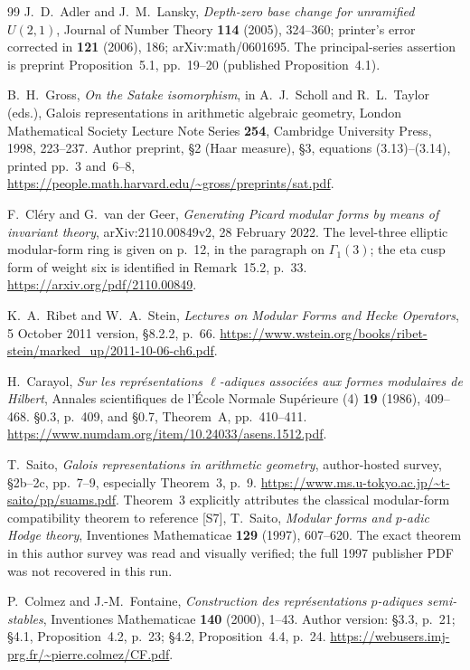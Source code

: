 \documentclass[11pt,a4paper]{article}
\theoremstyle{definition}
\begin{document}
\begin{thebibliography}{99}
J.~D.~Adler and J.~M.~Lansky,
\emph{Depth-zero base change for unramified $U(2,1)$},
Journal of Number Theory \textbf{114} (2005), 324--360;
printer's error corrected in \textbf{121} (2006), 186;
arXiv:math/0601695.
The principal-series assertion is preprint Proposition~5.1, pp.~19--20
(published Proposition~4.1).

B.~H.~Gross, \emph{On the Satake isomorphism}, in A.~J.~Scholl and
R.~L.~Taylor (eds.), Galois representations in arithmetic algebraic
geometry, London Mathematical Society Lecture Note Series \textbf{254},
Cambridge University Press, 1998, 223--237.
Author preprint, \S2 (Haar measure), \S3, equations (3.13)--(3.14),
printed pp.~3 and~6--8,
\url{https://people.math.harvard.edu/~gross/preprints/sat.pdf}.

F.~Cl\'ery and G.~van der Geer,
\emph{Generating Picard modular forms by means of invariant theory},
arXiv:2110.00849v2, 28 February 2022.
The level-three elliptic modular-form ring is given on p.~12, in the
paragraph on $\Gamma_1(3)$; the eta cusp form of weight six is identified
in Remark~15.2, p.~33.
\url{https://arxiv.org/pdf/2110.00849}.


K.~A.~Ribet and W.~A.~Stein,
\emph{Lectures on Modular Forms and Hecke Operators},
5 October 2011 version, \S8.2.2, p.~66.
\url{https://www.wstein.org/books/ribet-stein/marked_up/2011-10-06-ch6.pdf}.

H.~Carayol, \emph{Sur les repr\'esentations $\ell$-adiques associ\'ees
aux formes modulaires de Hilbert}, Annales scientifiques de l'\'Ecole
Normale Sup\'erieure (4) \textbf{19} (1986), 409--468.
\S0.3, p.~409, and \S0.7, Theorem~A, pp.~410--411.
\url{https://www.numdam.org/item/10.24033/asens.1512.pdf}.


T.~Saito, \emph{Galois representations in arithmetic geometry},
author-hosted survey, \S2b--2c, pp.~7--9,
especially Theorem~3, p.~9.
\url{https://www.ms.u-tokyo.ac.jp/~t-saito/pp/suams.pdf}.
Theorem~3 explicitly attributes the classical modular-form compatibility
theorem to reference [S7], T.~Saito,
\emph{Modular forms and $p$-adic Hodge theory},
Inventiones Mathematicae \textbf{129} (1997), 607--620.
The exact theorem in this author survey was read and visually verified;
the full 1997 publisher PDF was not recovered in this run.


P.~Colmez and J.-M.~Fontaine,
\emph{Construction des repr\'esentations $p$-adiques semi-stables},
Inventiones Mathematicae \textbf{140} (2000), 1--43.
Author version: \S3.3, p.~21; \S4.1, Proposition~4.2, p.~23;
\S4.2, Proposition~4.4, p.~24.
\url{https://webusers.imj-prg.fr/~pierre.colmez/CF.pdf}.


\end{thebibliography}
\end{document}
